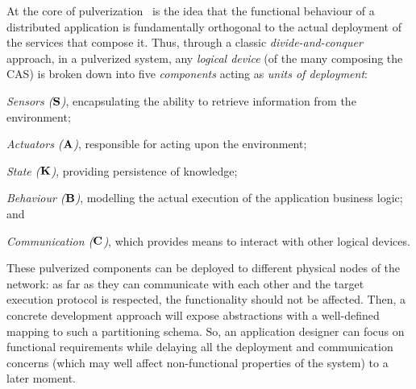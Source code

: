 At the core of pulverization~\cite{DBLP:journals/fi/CasadeiPPVW20} is the idea that the functional behaviour of a distributed application is fundamentally orthogonal to the actual deployment of the services that compose it.
%
Thus, through a classic \emph{divide-and-conquer} approach, in a pulverized system, any \emph{logical device} (of the many composing the CAS) is broken down into five \emph{components} acting as \emph{units of deployment}:
\begin{enumerate*}
 \item \emph{Sensors ($\mathbf{S}$)}, encapsulating the ability to retrieve information from the environment;
 \item \emph{Actuators ($\mathbf{A}$)}, responsible for acting upon the environment;
 \item \emph{State ($\mathbf{K}$)}, providing persistence of knowledge;
 \item \emph{Behaviour ($\mathbf{B}$)}, modelling the actual execution of the application business logic; and
 \item \emph{Communication ($\mathbf{C}$)}, which provides means to interact with other logical devices.
\end{enumerate*}
%
These pulverized components can be deployed to different physical nodes of the network:
 as far as they can communicate with each other
 and the target execution protocol is respected,
 the functionality should not be affected.
%
Then, 
 a concrete development approach
 will expose abstractions
 with a well-defined mapping
 to such a partitioning schema.
%
So, an application designer can focus on functional requirements 
 while delaying all the deployment and communication concerns 
 (which may well affect non-functional properties of the system) 
 to a later moment. 


